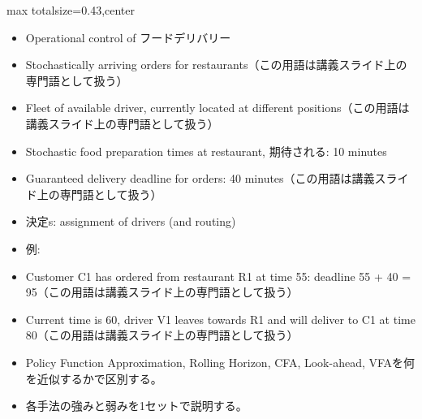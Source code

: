 \clearpage
{}
\begin{minipage}[t]{0.405\textwidth}
\begin{adjustbox}{max totalsize={\textwidth}{0.43\textheight},center}
\begin{minipage}{\textwidth}\scriptsize
{}\begin{itemize}
\item Operational control of フードデリバリー
\item Stochastically arriving orders for restaurants（この用語は講義スライド上の専門語として扱う）
\item Fleet of available driver, currently located at different positions（この用語は講義スライド上の専門語として扱う）
\item Stochastic food preparation times at restaurant, 期待される: 10 minutes
\item Guaranteed delivery deadline for orders: 40 minutes（この用語は講義スライド上の専門語として扱う）
\item 決定s: assignment of drivers (and routing)
\item 例:
\item Customer C1 has ordered from restaurant R1 at time 55: deadline 55 + 40 = 95（この用語は講義スライド上の専門語として扱う）
\item Current time is 60, driver V1 leaves towards R1 and will deliver to C1 at time 80（この用語は講義スライド上の専門語として扱う）
\end{itemize}\begin{itemize}
\item Policy Function Approximation, Rolling Horizon, CFA, Look-ahead, VFAを何を近似するかで区別する。
\item 各手法の強みと弱みを1セットで説明する。
\end{itemize}
\end{minipage}
\end{adjustbox}
\end{minipage}\hfill
